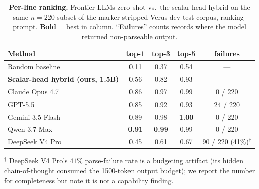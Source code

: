 \documentclass[10pt]{article}
\begin{document}
\begin{table}[t]
\centering
\small
\caption{\textbf{Per-line ranking.} Frontier LLMs zero-shot vs.\
the scalar-head hybrid on the same $n=220$ subset of the marker-stripped Verus
dev-test corpus, ranking-prompt. \textbf{Bold} = best in column.
``Failures'' counts records where the model returned non-parseable
output.}
\label{tab:llm-zeroshot}
\begin{tabular}{lcccc}
\toprule
Method & top-1 & top-3 & top-5 & failures \\
\midrule
Random baseline                                 & 0.11           & 0.37           & 0.54           & ---                 \\
\textbf{Scalar-head hybrid (ours, 1.5B)}                  & 0.56           & 0.82           & 0.93           & ---                 \\
Claude Opus 4.7~\cite{anthropic2026claude47}    & 0.86           & 0.97           & 0.99           & 0 / 220             \\
GPT-5.5~\cite{openai2026gpt55}                  & 0.85           & 0.92           & 0.93           & 24 / 220            \\
Gemini 3.5 Flash~\cite{google2026gemini35}      & 0.89           & 0.98           & \textbf{1.00}  & 0 / 220             \\
Qwen 3.7 Max~\cite{qwen2026qwen37}              & \textbf{0.91}  & \textbf{0.99}  & 0.99           & 0 / 220             \\
DeepSeek V4 Pro~\cite{deepseek2026v4}           & 0.45           & 0.61           & 0.67           & 90 / 220 (41\%)$^\dagger$ \\
\bottomrule
\end{tabular}
\smallskip

{\footnotesize $^\dagger$ DeepSeek V4 Pro's $41\%$ parse-failure rate
is a budgeting artifact (its hidden chain-of-thought consumed the
1500-token output budget); we report the number for completeness but
note it is not a capability finding.}
\end{table}
\end{document}

